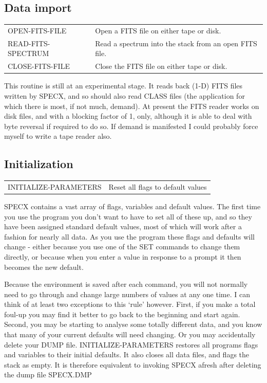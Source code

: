 \documentclass[11pt,twoside]{report}
\begin{document}
\subsection{Data import}

\begin{tabular}{ll}
OPEN-FITS-FILE      & Open a FITS file on either tape or disk.\\
READ-FITS-SPECTRUM  & Read a spectrum into the stack from an open FITS file.\\
CLOSE-FITS-FILE     & Close the FITS file on either tape or disk.\\
\end{tabular}

This routine is still at an experimental stage. It reads back (1-D) FITS files
written by SPECX, and so should also read CLASS files (the application for
which there is most, if not much, demand). At present the FITS reader works on
disk files, and with a blocking factor of 1, only, although it is able to deal
with byte reversal if required to do so. If demand is manifested I could
probably force myself to write a tape reader also.

\subsection{Initialization}

\begin{tabular}{ll}
INITIALIZE-PARAMETERS & Reset all flags to default values\\
\end{tabular}

SPECX contains a vast array of flags, variables and default values. The first
time you use the program you don't want to have to set all of these up, and
so they have been assigned standard default values, most of which will work
after a fashion for nearly all data. As you use the program these flags and
defaults will change - either because you use one of the SET commands to 
change them directly, or because when you enter a value in response to a
prompt it then becomes the new default.

Because the environment is
saved after each command, you will not normally need to go through and change
large numbers of values at any one time. I can think of at least two exceptions
to this `rule' however. First, if you make a total foul-up you may find it
better to go back to the beginning and start again. Second, you may be starting
to analyse some totally different data, and you know that many of your current
defaults will need changing. Or you may accidentally delete your DUMP file.
INITIALIZE-PARAMETERS restores all programs flags and variables to their initial
defaults. It also closes all data files, and flags the stack as empty.
It is therefore equivalent to invoking SPECX afresh after deleting the dump file
SPECX.DMP
\end{document}
